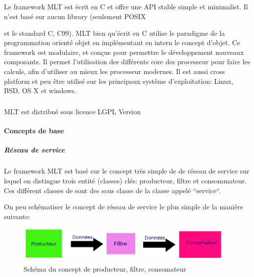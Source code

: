 \subparagraph{}

Le framework MLT est écrit en C et offre une API stable
simple et minimalist. Il n'est basé sur aucun library (seulement POSIX



et le standard C, C99). MLT bien qu'écrit en C utilise le paradigme
de la programmation orienté objet en implémentant en intern le
concept d'objet. Ce framework est modulaire, et conçue pour permettre
le développement nouveaux composants. Il permet l'utilisation des
différents core des processeur pour faire les calculs, afin d'utiliser
au mieux les processeur modernes. Il est aussi cross platform et peu
être utilisé sur les principaux système d'exploitation: Linux, BSD,
OS X et windows.

\subparagraph{}

MLT est distribué sous licence LGPL Version

\paragraph{Concepts de base}

\subparagraph{Réseau de service}

\subparagraph{}

Le framework MLT est basé sur le concept très simple de de réseau de
service sur lequel on distingue trois entité (classes) clés: producteur,
filtre et consommateur. Ces différent classes de sont des sous classe
de la classe appelé ``service``.

On peu schématiser le concept de réseau de service le plus simple de
la manière suivante:

\begin{figure} [H]

  \begin{center}

    \includegraphics[width=0.95\textwidth]{images/producerConsumer}

  \end{center}

  \caption{Schéma du concept de producteur, filtre, consomateur}

  \label{Yes}

\end{figure}

